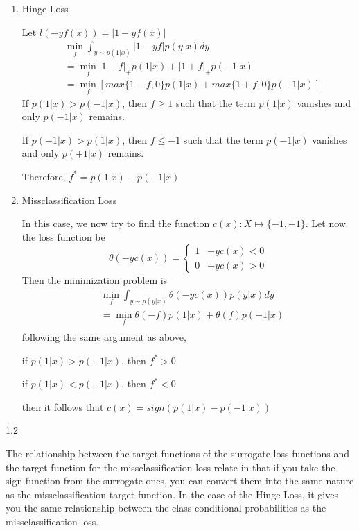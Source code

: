\documentclass[12pt]{report}
\begin{document}
\begin{enumerate}
\item Hinge Loss
  
  Let $l(-yf(x)) = \left| 1 - yf(x) \right|$
  \begin{equation}
    \begin{aligned}
      & \min_{f} \int_{y \sim p(1|x)} \left| 1 - yf \right| p(y|x)dy \\
      & = \min_{f} \left|1 - f \right|_{+} p(1|x) + \left|1 + f \right|_{+} p(-1|x) \\
      & = \min_{f} \left[ max\{1-f, 0\}p(1|x) + max\{1+f, 0\}p(-1|x)\right]
    \end{aligned}
  \end{equation}
  If $p(1|x) > p(-1|x)$, then $f \geq 1$ such that the term $p(1|x)$ vanishes and only $p(-1|x)$ remains.
  
  If $p(-1|x) > p(1|x)$, then $f \leq -1$ such that the term $p(-1 | x)$ vanishes and only $p(+1|x)$ remains.
  
  Therefore, $f^{*} = p(1|x) - p(-1|x)$

\item Missclassification Loss
  
  In this case, we now try to find the function $c(x) : X \mapsto \{-1, +1\}$. Let now the
  loss function be
  \begin{equation}
    \theta(-yc(x)) = 
    \begin{cases}
      \text{1} & -yc(x) < 0 \\
      \text{0} & -yc(x) > 0   
    \end{cases}
  \end{equation}
  Then the minimization problem is
  \begin{equation}
    \begin{aligned}
      & \min_{f} \int_{y \sim p(y|x)} \theta(-yc(x))p(y|x)dy  \\
      & = \min_{f} \theta(-f)p(1|x) + \theta(f)p(-1|x) \\
    \end{aligned}
  \end{equation}
  following the same argument as above,
  
  if $p(1|x) > p(-1|x)$, then $f^{*} > 0$
  
  if $p(1|x) < p(-1|x)$, then $f^{*} < 0$
  
  then it follows that $c(x) = sign(p(1|x) - p(-1|x)) $
\end{enumerate}

1.2

The relationship between the target functions of the surrogate loss functions and the target
function for the missclassification loss relate in that if you take the sign function from the surrogate ones, you can convert them into the same nature as the missclassification target function. In the case of the Hinge Loss, it gives you the same relationship between the class conditional probabilities as the missclassification loss. 
\end{document}
